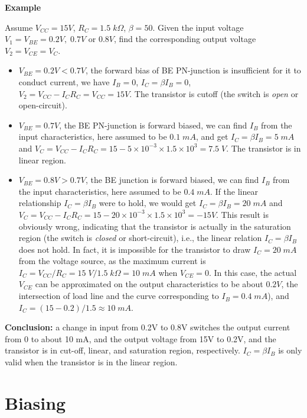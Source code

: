 

{\bf Example}


Assume $V_{CC}=15V$, $R_C=1.5\;k\Omega$, $\beta=50$. Given the input voltage 
$V_1=V_{BE}=0.2V,\;0.7V$ or $0.8V$, find the corresponding output voltage 
$V_2=V_{CE}=V_C$.

\begin{itemize}
\item $V_{BE}=0.2V < 0.7V$, the forward bias of BE PN-junction is insufficient
  for it to conduct current, we have $I_B=0$, $I_C=\beta I_B=0$, $V_2
  =V_{CC}-I_C R_C=V_{CC}=15V$. The transistor is cutoff (the switch is 
  {\em open} or open-circuit).
\item $V_{BE}=0.7V$, the BE PN-junction is forward biased, we can find $I_B$
  from the input characteristics, here assumed to be $0.1\;mA$, and get
  $I_C=\beta I_B=5\;mA$ and 
  $V_C=V_{CC}-I_C R_C=15-5\times 10^{-3} \times 1.5\times 10^{3} =7.5\; V$. 
  The transistor is in linear region.
\item $V_{BE}=0.8V>0.7V$, the BE junction is forward biased, we can find $I_B$
  from the input characteristics, here assumed to be $0.4\;mA$. If the linear
  relationship $I_C=\beta I_B$ were to hold, we would get $I_C=\beta I_B=20\;mA$
  and $V_C=V_{CC}-I_C R_C=15-20\times 10^{-3} \times 1.5\times 10^{3}=-15 V$. 
  This result is obviously wrong, indicating that the transistor is actually 
  in the saturation region (the switch is {\em closed} or short-circuit), 
  i.e., the linear relation $I_C=\beta I_B$ does not hold. In fact, it is 
  impossible for the transistor to draw $I_C=20\;mA$ from the voltage source, 
  as the maximum current is $I_C=V_{CC}/R_C=15\;V/1.5\; k\Omega=10\;mA$ when
  $V_{CE}=0$. In this case, the actual $V_{CE}$ can be approximated on the output 
  characteristics to be about $0.2V$, the intersection of load line and the 
  curve corresponding to $I_B=0.4\;mA$), and $I_C=(15-0.2)/1.5\approx 10\;mA$. 
\end{itemize}
{\bf Conclusion: } a change in input from 0.2V to 0.8V switches the output 
current from 0 to about 10 mA, and the output voltage from 15V to 0.2V,
and the transistor is in cut-off, linear, and saturation region, respectively. 
$I_C=\beta I_B$ is only valid when the transistor is in the linear region.

\section*{Biasing}

